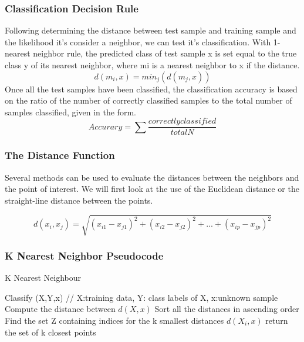 \documentclass{report}
\begin{document}
\subsubsection*{Classification Decision Rule}
Following determining the distance between test sample and training sample and the likelihood it's consider a neighbor, we can test it's classification.
With 1-nearest neighbor rule, the predicted class of test sample x is set equal to the true class y of its nearest neighbor, where mi is a nearest neighbor to x if the distance.
\begin{equation}
d(m_{i},x) = min_{j}(d(m_{j},x))
\end{equation}
Once all the test samples have been classified, the classification accuracy is based on the ratio of the number of correctly classified samples to the total number of samples classified, given in the form.
\begin{equation}
Accurary = \sum \frac{correctly classified}{total N}
\end{equation}
		


\subsubsection*{The Distance Function}

Several methods can be used to evaluate the distances between the neighbors and the point of interest.
We will first look at the use of the Euclidean distance or the straight-line distance between the points.

\begin{equation}
d(x_{i},x_{j}) = \sqrt{(x_{i1} - x_{j1})^2 + (x_{i2} - x_{j2})^2 + ... + (x_{ip} - x_{jp})^2}
\end{equation}

\subsubsection{K Nearest Neighbor Pseudocode }
\begin{algorithm}
  \caption{K Nearest Neighbour}
  \begin{algorithmic}
  	\State Classify (X,Y,x) // X:training data, Y: class labels of X, x:unknown sample
	\State Compute the distance between $d(X, x)$
	\State Sort all the distances in ascending order
	\EndFor
	\State Find the set Z containing indices for the k smallest distances $d(X_{i},x)$
	\State return the set of k closest points 
  \end{algorithmic}
\end{algorithm}
\end{document}

